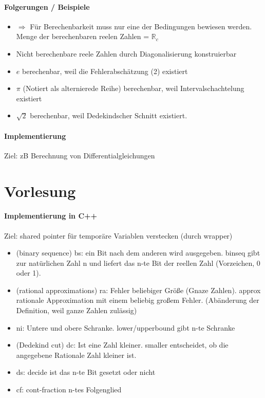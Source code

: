 \documentclass[ngerman]{scrartcl}
\begin{document}
 \paragraph{Folgerungen / Beispiele}
\begin{itemize}
  \item $ \Rightarrow $ Für Berechenbarkeit muss nur eine der Bedingungen bewiesen werden. Menge der berechenbaren reelen Zahlen = $ \mathbb{R}_c $
  \item Nicht berechenbare reele Zahlen durch Diagonalisierung konstruierbar
  \item $ e $ berechenbar, weil die Fehlerabschätzung (2) existiert
  \item $ \pi $ (Notiert als alternierede Reihe) berechenbar, weil Intervalschachtelung existiert
  \item $ \sqrt{2} $ berechenbar, weil Dedekindscher Schnitt existiert.
 \end{itemize}

\paragraph{Implementierung}
Ziel: zB Berechnung von Differentialgleichungen

\section{Vorlesung}
\paragraph{Implementierung in C++}
Ziel: shared pointer für temporäre Variablen verstecken (durch wrapper)
\begin{itemize}
  \item (binary sequence) bs: ein Bit nach dem anderen wird ausgegeben. binseq gibt zur natürlichen Zahl n und liefert das n-te Bit der reellen Zahl (Vorzeichen, 0 oder 1).
  \item (rational approximations) ra: Fehler beliebiger Größe (Gnaze Zahlen). approx rationale Approximation mit einem beliebig großem Fehler. (Abänderung der Definition, weil ganze Zahlen zulässig)
  \item ni: Untere und obere Schranke. lower/upperbound gibt n-te Schranke
  \item (Dedekind cut) dc: Ist eine Zahl kleiner. smaller entscheidet, ob die angegebene Rationale Zahl kleiner ist.
  \item ds: decide ist das n-te Bit gesetzt oder nicht
  \item cf: cont-fraction n-tes Folgenglied
\end{itemize}
\end{document}
